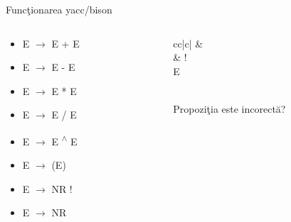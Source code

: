 \documentclass[pdf]{beamer}
\begin{document}
\begin{frame}{Funcţionarea yacc/bison}
\begin{columns}
\begin{column}{0.5\textwidth}
\begin{itemize}
	\item
	E $\rightarrow$ E + E

	\item
	E $\rightarrow$ E - E

	\item
	E $\rightarrow$ E * E

	\item
	E $\rightarrow$ E / E

	\item
	E $\rightarrow$ E \textsuperscript{$\wedge$} E

	\item
	E $\rightarrow$ (E)

	\item
	E $\rightarrow$ NR !

	\item
	E $\rightarrow$ NR

\end{itemize}
\end{column}

\begin{column}{0.3\textwidth}
\begin{tabular}{cc|c|} 
 & {\hspace{0.4cm} \textepsilon} \\ 
 &   
 {!} \\
 {E} \\ 
\\
\end{tabular}
	
Propoziţia este incorectă?


\end{column}
\end{columns}
\end{frame}
\end{document}
